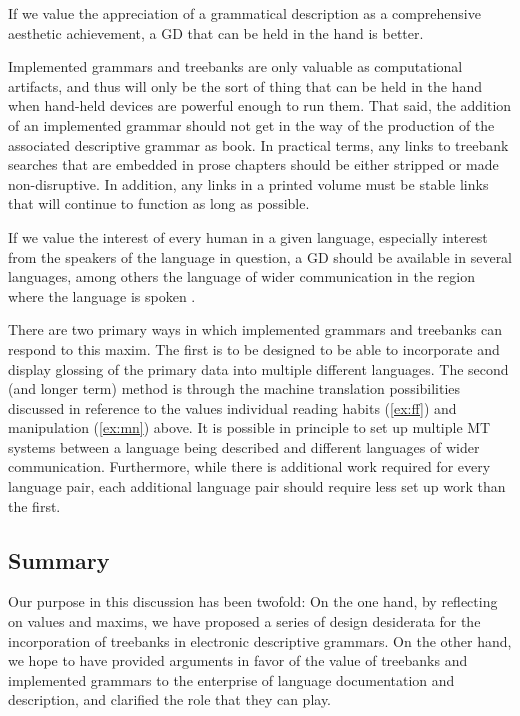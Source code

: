 \documentclass[12pt]{article}
\begin{document}
\begin{exe}
 If we value the appreciation of a grammatical
description as a comprehensive aesthetic achievement, a GD that can 
be held in the hand is better.
\end{exe}

Implemented grammars and treebanks are only valuable as
computational artifacts, and thus will only be the sort of
thing that can be held in the hand when hand-held devices
are powerful enough to run them.  That said, the addition of
an implemented grammar should not get in the way of the production
of the associated descriptive grammar as book.  In practical terms,
any links to treebank searches that are embedded in prose
chapters should be either stripped or made non-disruptive.
In addition, any links in a printed volume must be stable
links that will continue to function as long as possible.

\begin{exe}
 If we value the interest of every human
in a given language, especially interest from the speakers of the language
in question, a GD should be available in several languages, among others
the language of wider communication in the region where the language
is spoken \cite[433]{Weber:06}.
\end{exe}

There are two primary ways in which implemented grammars and treebanks
can respond to this maxim.  The first is to be designed to be able to
incorporate and display glossing of the primary data into multiple
different languages.  The second (and longer term) method is through
the machine translation possibilities discussed in reference to the
values {\sc individual reading habits} (\ref{ex:ff}) and {\sc
  manipulation} (\ref{ex:mn}) above.  It is possible in principle to
set up multiple MT systems between a language being described and
different languages of wider communication.  Furthermore, while there
is additional work required for every language pair, each additional
language pair should require less set up work than the first.

\subsection{Summary}

Our purpose in this discussion has been twofold: On the one hand, by
reflecting on values and maxims, we have proposed a series of design
desiderata for the incorporation of treebanks in electronic
descriptive grammars.  On the other hand, we hope to have provided
arguments in favor of the value of treebanks and implemented grammars
to the enterprise of language documentation and description, and
clarified the role that they can play.
\end{document}
